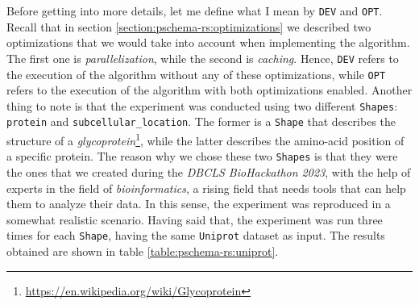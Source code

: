 Before getting into more details, let me define what I mean by \texttt{DEV} and \texttt{OPT}. Recall that in section \ref{section:pschema-rs:optimizations} we described two optimizations that we would take into account when implementing the algorithm. The first one is \textit{parallelization}, while the second is \textit{caching}. Hence, \texttt{DEV} refers to the execution of the algorithm without any of these optimizations, while \texttt{OPT} refers to the execution of the algorithm with both optimizations enabled. Another thing to note is that the experiment was conducted using two different \texttt{Shapes}: \texttt{protein} and \texttt{subcellular\_location}. The former is a \texttt{Shape} that describes the structure of a \textit{glycoprotein}\footnote{\url{https://en.wikipedia.org/wiki/Glycoprotein}}, while the latter describes the amino-acid position of a specific protein. The reason why we chose these two \texttt{Shapes} is that they were the ones that we created during the \textit{DBCLS BioHackathon 2023}, with the help of experts in the field of \textit{bioinformatics}, a rising field that needs tools that can help them to analyze their data. In this sense, the experiment was reproduced in a somewhat realistic scenario. Having said that, the experiment was run three times for each \texttt{Shape}, having the same \texttt{Uniprot} dataset as input. The results obtained are shown in table \ref{table:pschema-rs:uniprot}.

